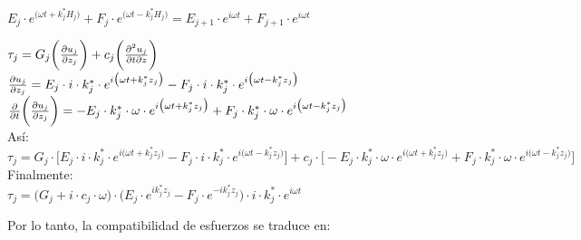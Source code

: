 \begin{enumeratebf}
	\item $E_j\cdot e^{\big(\omega t + k_j^* H_j\big)} + F_j\cdot e^{\big(\omega t - k_j^* H_j\big)} = E_{j+1}\cdot e^{i\omega t} + F_{j+1}\cdot e^{i\omega t}$
	
	\item $\tau_j = G_j\bigg(\pdv{u_j}{z_j}\bigg)+c_j\bigg(\frac{\partial^2 u_j}{\partial t \partial z}\bigg)$ \\
	$\pdv{u_j}{z_j} = E_j \cdot i \cdot k_j^* \cdot e^{i\big(\omega t  + k_j^* z_j\big)} - F_j \cdot i \cdot k_j^* \cdot e^{i\big(\omega t - k_j^*z_j\big)}$ \\
	$\frac{\partial}{\partial t}\bigg(\pdv{u_j}{z_j}\bigg) = -E_j \cdot k_j^* \cdot \omega \cdot e^{i\big(\omega t + k_j^* z_j\big)}+F_j \cdot k_j^* \cdot \omega \cdot e^{i\big(\omega t - k_j^* z_j\big)}$ \\
	
	Así: \\
	$\tau_j = G_j \cdot \bigg[E_j \cdot i \cdot k_j^* \cdot e^{i\big(\omega t  + k_j^* z_j\big)} - F_j \cdot i \cdot k_j^* \cdot e^{i\big(\omega t - k_j^*z_j\big)}\bigg] + c_j \cdot \bigg[-E_j \cdot k_j^* \cdot \omega \cdot e^{i\big(\omega t + k_j^* z_j\big)}+F_j \cdot k_j^* \cdot \omega \cdot e^{i\big(\omega t - k_j^* z_j\big)}\bigg]$ \\
	
	Finalmente: \\
	$\tau_j = \big(G_j + i \cdot c_j \cdot \omega \big) \cdot \big(E_j \cdot e^{i k_j^* z_j}-F_j \cdot e^{-i k_j^* z_j}\big) \cdot i \cdot k_j^* \cdot e^{i\omega t}$
\end{enumeratebf}

Por lo tanto, la compatibilidad de esfuerzos se traduce en:


 \\

